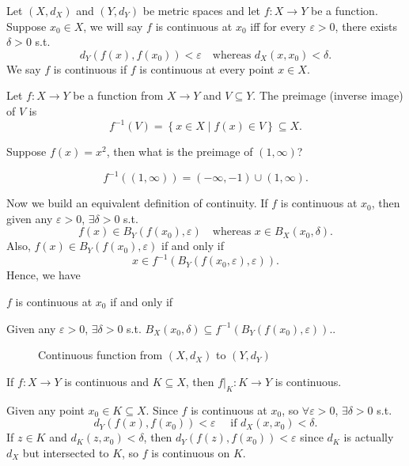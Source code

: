 \begin{definition} \label{def: continuous}
    Let \((X, d_X)\) and \((Y, d_Y)\) be metric spaces and let \(f: X \to Y\) be a function. Suppose \(x_0 \in X\), we will say \(f\) is continuous at \(x_0\) iff for every \(\varepsilon > 0\), there exists \(\delta > 0\) s.t. 
    \[
        d_Y(f(x), f(x_0)) < \varepsilon \quad \text{whereas } d_X(x, x_0) < \delta.
    \] We say \(f\) is continuous if \(f\) is continuous at every point \(x \in X\).     
\end{definition}

\begin{definition}[Preimage] \label{def: preimage}
    Let \(f : X \to Y\) be a function from \(X \to Y\) and \(V \subseteq Y\). The preimage (inverse image) of \(V\) is 
    \[
        f^{-1}(V) = \left\{ x\in X \mid f(x) \in V \right\} \subseteq X.
    \]    
\end{definition}

\begin{eg}
    Suppose \(f(x) = x^2\), then what is the preimage of \((1, \infty )\)?  
\end{eg}
\begin{answer}
    \[
        f^{-1}((1, \infty )) = (-\infty , -1) \cup (1, \infty ).
    \]
\end{answer}
Now we build an equivalent definition of continuity. If \(f\) is continuous at \(x_0\), then given any \(\varepsilon > 0\), \(\exists \delta > 0\) s.t. 
\[
    f(x) \in B_Y(f(x_0), \varepsilon ) \quad \text{whereas } x \in B_X(x_0, \delta ).
\]  Also, \(f(x) \in B_Y(f(x_0), \varepsilon )\) if and only if
\[
    x \in f^{-1}(B_Y(f(x_0, \varepsilon ), \varepsilon )).
\] Hence, we have 
\begin{corollary}
    \(f\) is continuous at \(x_0\) if and only if 
    \begin{center}
        Given any \(\varepsilon > 0\), \(\exists \delta > 0\) s.t. \(B_X(x_0, \delta ) \subseteq f^{-1}(B_Y(f(x_0), \varepsilon )).\).   
    \end{center}  
\end{corollary}
\begin{figure}[H]
    \centering
    \caption{Continuous function from \((X, d_X)\) to \((Y, d_Y)\)}
    \label{fig:conti}
\end{figure}
\begin{remark} \label{rmk: if f conti then f intersect K conti}
    If \(f: X \to Y\) is continuous and \(K \subseteq X\), then \(f\vert_K : K \to Y\) is continuous.   
\end{remark}
\begin{explanation}
    Given any point \(x_0 \in K \subseteq X\). Since \(f\) is continuous at \(x_0\), so \(\forall \varepsilon > 0\), \(\exists \delta > 0\) s.t. 
    \[
        d_Y\left( f(x), f(x_0) \right) < \varepsilon \quad \text{ if } d_X(x, x_0) < \delta. 
    \]     
    If \(z \in K\) and \(d_K(z, x_0) < \delta \), then \(d_Y(f(z), f(x_0)) <\varepsilon \) since \(d_K\) is actually \(d_X\) but intersected to \(K\), so \(f\) is continuous on \(K\).     
\end{explanation}

